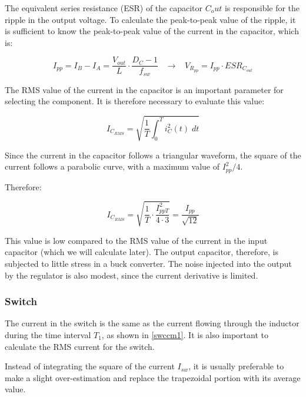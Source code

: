 \documentclass[../main.tex]{subfiles}
\begin{document}
The equivalent series resistance (ESR) of the capacitor $C_out$ is responsible for the ripple in the output voltage. To calculate the peak-to-peak value of the ripple, it is sufficient to know the peak-to-peak value of the current in the capacitor, which is:

\begin{equation}
	I_{pp} = I_B - I_A = \frac{V_{out}}{L} \cdot \frac{D_C - 1}{f_{sw}} \hspace{10pt} \longrightarrow \hspace{10pt} V_{R_{pp}} = I_{pp} \cdot \unit{ESR_{C_{out}}}
\end{equation}

The RMS value of the current in the capacitor is an important parameter for selecting the component. 
It is therefore necessary to evaluate this value:

\begin{equation}
	I_{C_{RMS}} = \sqrt{\frac{1}{T} \int_0^T i^2_C(t)\; dt}
\end{equation}

Since the current in the capacitor follows a triangular waveform, the square of the current follows a parabolic curve, with a maximum value of $I^2_{pp}/4$. 

Therefore:

\begin{equation}
	I_{C_{RMS}} = \sqrt{\frac{1}{T} \cdot \frac{I^2_{pp T}}{4 \cdot 3}} = \frac{I_{pp}}{\sqrt{12}}
\end{equation}

This value is low compared to the RMS value of the current in the input capacitor (which we will calculate later). The output capacitor, therefore, is subjected to little stress in a buck converter. The noise injected into the output by the regulator is also modest, since the current derivative is limited.

\subsubsection*{Switch}


The current in the switch is the same as the current flowing through the inductor during the time interval $T_1$, as shown in \autoref{swccm1}. It is also important to calculate the RMS current for the switch. 

Instead of integrating the square of the current $I_{sw}$, it is usually preferable to make a slight over-estimation and replace the trapezoidal portion with its average value. 
\end{document}
